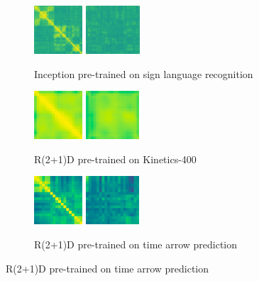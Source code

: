 \documentclass[final]{cvpr}
\begin{document}
\begin{figure}[t]
	\begin{subfigure}[t]{0.5\linewidth}
		\centering\captionsetup{width=.9\linewidth, justification=raggedright}
		\includegraphics[height=1.8cm]{fig/matrices/a_2d}
		\includegraphics[height=1.8cm]{fig/matrices/b_2d}
		\caption{\centering Inception pre-trained on sign language recognition}
	\end{subfigure}\hfill
	\begin{subfigure}[t]{0.5\linewidth}
		\centering\captionsetup{width=.9\linewidth, justification=raggedright}
		\includegraphics[height=1.8cm]{fig/matrices/a_kinetics}
		\includegraphics[height=1.8cm]{fig/matrices/b_kinetics}
		\caption{\centering R(2+1)D pre-trained on Kinetics-400}
	\end{subfigure}
	\par\medskip
	\begin{subfigure}[t]{0.5\linewidth}
		\centering\captionsetup{width=.9\linewidth, justification=raggedright}
		\includegraphics[height=1.8cm]{fig/matrices/a_tarrow}
		\includegraphics[height=1.8cm]{fig/matrices/b_tarrow}
		\caption{\centering R(2+1)D pre-trained on time arrow prediction}

\end{subfigure}
\end{figure}
\end{document}

